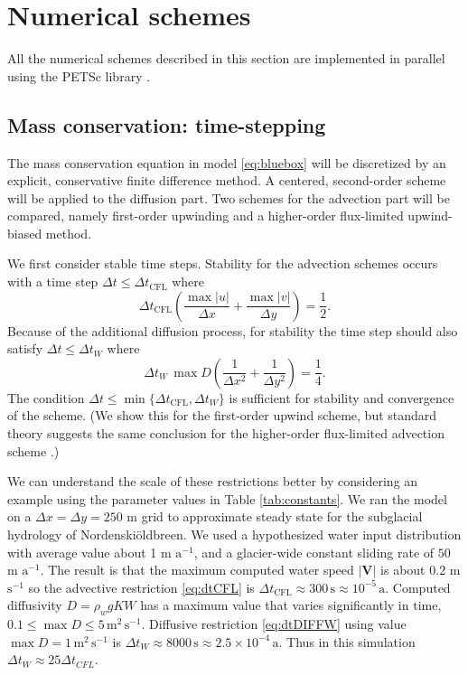 \documentclass[gmd]{copernicus}   %
\newcommand{\text}{\textrm}
\newcommand\bV{\mathbf{V}}
\newcommand{\Nbreen}{Nordenski\"oldbreen\xspace}
\begin{document}
\section{Numerical schemes}  \label{sec:num}

All the numerical schemes described in this section are implemented in parallel using the PETSc library \citep{petsc-user-ref}.

\subsection{Mass conservation: time-stepping}  The mass conservation equation in model \eqref{eq:bluebox} will be discretized by an explicit, conservative finite difference method.   A centered, second-order scheme will be applied to the diffusion part.  Two schemes for the advection part will be compared, namely first-order upwinding and a higher-order flux-limited upwind-biased method.

We first consider stable time steps.  Stability for the advection schemes occurs with a time step $\Delta t \le \Delta t_{\text{CFL}}$ where
\begin{equation}
\Delta t_{\text{CFL}} \left(\frac{\max |u|}{\Delta x} + \frac{\max |v|}{\Delta y}\right) = \frac{1}{2}. \label{eq:dtCFL}
\end{equation}
Because of the additional diffusion process, for stability the time step should also satisfy $\Delta t \le \Delta t_{W}$  where \citep{MortonMayers}
\begin{equation}
\Delta t_W\, \max D \left(\frac{1}{\Delta x^2} + \frac{1}{\Delta y^2}\right) = \frac{1}{4}. \label{eq:dtDIFFW}
\end{equation}
The condition $\Delta t \le \min\{\Delta t_{\text{CFL}}, \Delta t_W\}$ is sufficient for stability and convergence of the scheme.  (We show this for the first-order upwind scheme, but standard theory suggests the same conclusion for the higher-order flux-limited advection scheme \citep{HundsdorferVerwer2010}.)

We can understand the scale of these restrictions better by considering an example using the parameter values in Table \ref{tab:constants}.  We ran the model on a $\Delta x = \Delta y = 250$ m grid to approximate steady state for the subglacial hydrology of \Nbreen \citep{vanPeltthesis}.  We used a hypothesized water input distribution with average value about 1 m $\text{a}^{-1}$, and a glacier-wide constant sliding rate of $50$ m $\text{a}^{-1}$.  The result is that the maximum computed water speed $|\bV|$ is about $0.2$ m $\text{s}^{-1}$ so the advective restriction \eqref{eq:dtCFL} is $\Delta t_{\text{CFL}} \approx 300\,\text{s} \approx 10^{-5}\,\text{a}$.  Computed diffusivity $D = \rho_w g K W$ has a maximum value that varies significantly in time, $0.1 \le \max D \le 5 \,\text{m}^2\,\text{s}^{-1}$.  Diffusive restriction \eqref{eq:dtDIFFW} using value $\max D=1\,\text{m}^2\,\text{s}^{-1}$ is $\Delta t_W \approx 8000\,\text{s} \approx 2.5 \times 10^{-4}\,\text{a}$.  Thus in this simulation $\Delta t_W \approx 25 \Delta t_{CFL}$.
\end{document}

